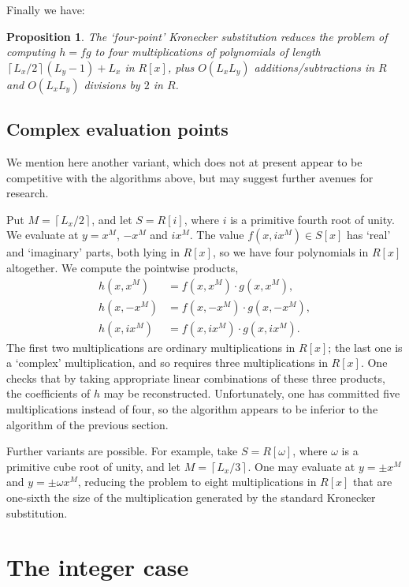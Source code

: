 \documentclass{amsart}
\newcommand{\ceil}[1]{\left\lceil{#1}\right\rceil}
\newtheorem{prop}[thm]{Proposition}
\theoremstyle{definition}
\theoremstyle{remark}
\begin{document}
Finally we have:
\begin{prop}
\label{prop:polynomial-four-ks}
The `four-point' Kronecker substitution reduces the problem of computing $h = fg$ to four multiplications of polynomials of length $\ceil{L_x/2}(L_y - 1) + L_x$ in $R[x]$, plus $O(L_x L_y)$ additions/subtractions in $R$ and $O(L_x L_y)$ divisions by $2$ in $R$.
\end{prop}


\subsection{Complex evaluation points} We mention here another variant, which does not at present appear to be competitive with the algorithms above, but may suggest further avenues for research.

Put $M = \ceil{L_x/2}$, and let $S = R[i]$, where $i$ is a primitive fourth root of unity. We evaluate at $y = x^M$, $-x^M$ and $i x^M$. The value $f(x, i x^M) \in S[x]$ has `real' and `imaginary' parts, both lying in $R[x]$, so we have four polynomials in $R[x]$ altogether. We compute the pointwise products,
\begin{align*}
  h(x, x^M) & = f(x, x^M) \cdot g(x, x^M), \\
  h(x, -x^M) & = f(x, -x^M) \cdot g(x, -x^M), \\
  h(x, ix^M) & = f(x, ix^M) \cdot g(x, ix^M).
\end{align*}
The first two multiplications are ordinary multiplications in $R[x]$; the last one is a `complex' multiplication, and so requires three multiplications in $R[x]$. One checks that by taking appropriate linear combinations of these three products, the coefficients of $h$ may be reconstructed. Unfortunately, one has committed five multiplications instead of four, so the algorithm appears to be inferior to the algorithm of the previous section.

Further variants are possible. For example, take $S = R[\omega]$, where $\omega$ is a primitive cube root of unity, and let $M = \ceil{L_x/3}$. One may evaluate at $y = \pm x^M$ and $y = \pm \omega x^M$, reducing the problem to eight multiplications in $R[x]$ that are one-sixth the size of the multiplication generated by the standard Kronecker substitution.



\section{The integer case}
\label{sec:integer}
\end{document}
